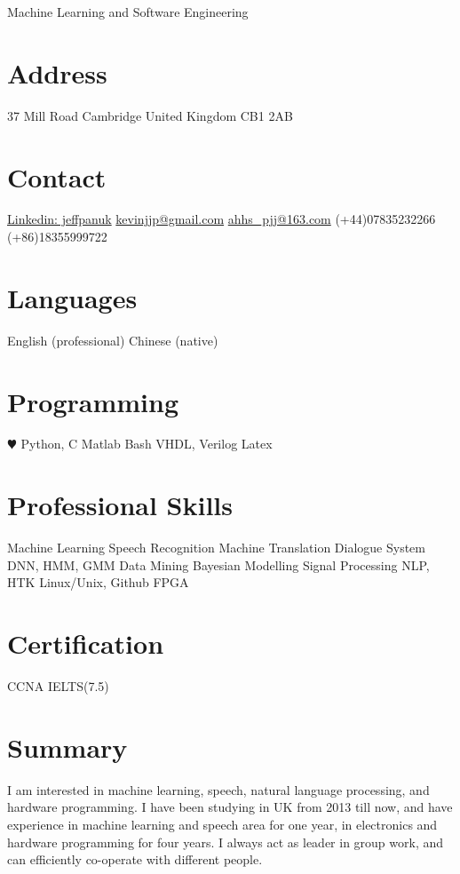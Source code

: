 \documentclass[]{friggeri-cv}
\begin{document}
       {Machine Learning and Software Engineering}


\begin{aside}
  \section{Address}
    37 Mill Road
    Cambridge
    United Kingdom
    CB1 2AB
    ~
  \section{Contact}
  	\href{https:uk.linkedin.com/in/jeffpanuk}{Linkedin: jeffpanuk}
   \href{mailto:kevinjjp@gmail.com}{kevinjjp@gmail.com}
      \href{mailto:ahhs_pjj@163.com}{ahhs\_pjj@163.com}
     (+44)07835232266
	  (+86)18355999722
	~
  \section{Languages}
    English (professional)
    Chinese (native)
    ~
  \section{Programming}
    {\color{red} $\varheartsuit$} Python, C
    Matlab
    Bash
    VHDL, Verilog
    Latex
    ~
  \section{Professional Skills}
	Machine Learning
	Speech Recognition
	Machine Translation
	Dialogue System
	DNN, HMM, GMM
	Data Mining
	Bayesian Modelling
	Signal Processing
	NLP, HTK
  	Linux/Unix, Github
  	FPGA  
  	~
  \section{Certification}
  	CCNA
  	IELTS(7.5)	
\end{aside}

\section{Summary}

I am interested in machine learning, speech, natural language processing, and hardware programming. I have been studying in UK from 2013 till now, and have experience in machine learning and speech area for one year, in electronics and hardware programming for four years. I always act as leader in group work, and can efficiently co-operate with different people.
\end{document}
